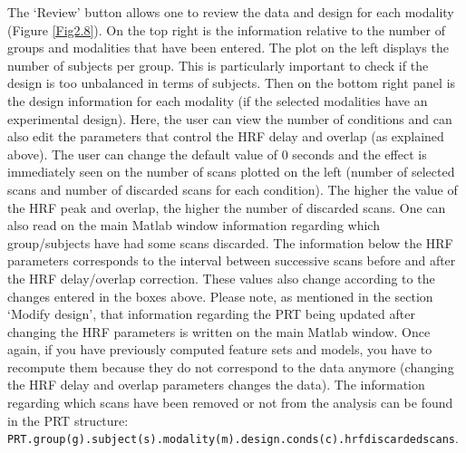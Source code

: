 The `Review' button allows one to review the data and design for each modality (Figure \ref{Fig2.8}). On the top right is the information relative to the number of groups and modalities that have been entered. The plot on the left displays the number of subjects per group. This is particularly important to check if the design is too unbalanced in terms of subjects. Then on the bottom right panel is the design information for each modality (if the selected modalities have an experimental design). Here, the user can view the number of conditions and can also edit the parameters that control the HRF delay and overlap (as explained above). The user can change the default value of 0 seconds and the effect is immediately seen on the number of scans plotted on the left (number of selected scans and number of discarded scans for each condition). The higher the value of the HRF peak and overlap, the higher the number of discarded scans. One can also read on the main Matlab window information regarding which group/subjects have had some scans discarded. The information below the HRF parameters corresponds to the interval between successive scans before and after the HRF delay/overlap correction. These values also change according to the changes entered in the boxes above. Please note, as mentioned in the section `Modify design', that information regarding the PRT being updated after changing the HRF parameters is written on the main Matlab window. 
Once again, if you have previously computed feature sets and models, you have to recompute them because they do not correspond to the data anymore (changing the HRF delay and overlap parameters changes the data). 
The information regarding which scans have been removed or not from the analysis can be found in the PRT structure: \\
{\tt PRT.group(g).subject(s).modality(m).design.conds(c).hrfdiscardedscans}.

